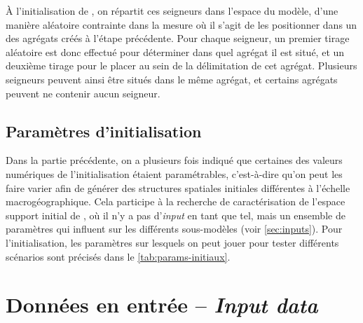 À l'initialisation de \simfeodal{}, on répartit ces seigneurs dans l'espace du modèle, d'une manière aléatoire contrainte dans la mesure où il s'agit de les positionner dans un des agrégats créés à l'étape précédente.
Pour chaque seigneur, un premier tirage aléatoire est donc effectué pour déterminer dans quel agrégat il est situé, et un deuxième tirage pour le placer au sein de la délimitation de cet agrégat.
Plusieurs seigneurs peuvent ainsi être situés dans le même agrégat, et certains agrégats peuvent ne contenir aucun seigneur.


\subsection{Paramètres d'initialisation}

Dans la partie précédente, on a plusieurs fois indiqué que certaines des valeurs numériques de l'initialisation étaient paramétrables, c'est-à-dire qu'on peut les faire varier afin de générer des structures spatiales initiales différentes à l'échelle macrogéographique.
Cela participe à la recherche de caractérisation de l'espace support initial de \simfeodal{}, où il n'y a pas d'\og \textit{input}\fg{} en tant que tel, mais un ensemble de paramètres qui influent sur les différents sous-modèles (voir \cref{sec:inputs}).
Pour l'initialisation, les paramètres sur lesquels on peut jouer pour tester différents scénarios sont précisés dans le \cref{tab:params-initiaux}.



\let\orisectionmark\sectionmark
\renewcommand\sectionmark[1]{}%
\section[Données en entrée -- \textit{Input data}]{Données en entrée -- \large{\textit{Input data}} \label{sec:inputs}}
\orisectionmark{Données en entrée}
\let\sectionmark\orisectionmark

